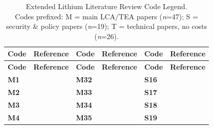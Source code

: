 \documentclass{article}
\renewcommand\_{\textunderscore\allowbreak}
\begin{document}
\clearpage

\captionsetup[longtable]{singlelinecheck=false}
{
\singlespacing
\setlength{\LTpre}{0pt}
\setlength{\LTpost}{4pt}

\small
\setlength{\tabcolsep}{4pt}
\begin{longtable}{p{0.9cm}>{\raggedright\arraybackslash}p{4cm}@{\hskip 0.5cm}p{0.9cm}>{\raggedright\arraybackslash}p{4cm}@{\hskip 0.5cm}p{0.9cm}>{\raggedright\arraybackslash}p{4cm}}
\caption[Extended Lithium Literature Review Code Legend.]{Extended Lithium Literature Review Code Legend. \\ Codes prefixed: \textsf{M} = main LCA/TEA papers (\emph{n}=47);
\textsf{S} = security \& policy papers (\emph{n}=19);
\textsf{T} = technical papers, no costs (\emph{n}=26).}
\label{tab:c2-litreview-legend}\\
\toprule
\textbf{Code} & \textbf{Reference} &
\textbf{Code} & \textbf{Reference} &
\textbf{Code} & \textbf{Reference} \\
\midrule
\endfirsthead
\toprule
\textbf{Code} & \textbf{Reference} &
\textbf{Code} & \textbf{Reference} &
\textbf{Code} & \textbf{Reference} \\
\midrule
\endhead
\bottomrule
\endfoot
\textcolor{codelabel}{\textsf{\textbf{M1}}} & \citet{agusdinataSocioenvironmentalImpactsLithium2018} & \textcolor{codelabel}{\textsf{\textbf{M32}}} & \citet{schenkerLithiumGeothermalBrines2024} & \textcolor{codelabel}{\textsf{\textbf{S16}}} & \citet{renMultiplexCharacteristicsVulnerability2024} \\
\textcolor{codelabel}{\textsf{\textbf{M2}}} & \citet{alessiaChallengesSustainableLithium2021} & \textcolor{codelabel}{\textsf{\textbf{M33}}} & \citet{schenkerCurrentFutureImpacts2025} & \textcolor{codelabel}{\textsf{\textbf{S17}}} & \citet{sunGlobalCompetitionLithiumIon2021} \\
\textcolor{codelabel}{\textsf{\textbf{M3}}} & \citet{ambroseUnderstandingFutureLithium2020a} & \textcolor{codelabel}{\textsf{\textbf{M34}}} & \citet{schombergExtendedLifeCycle2021} & \textcolor{codelabel}{\textsf{\textbf{S18}}} & \citet{tanMappingCobaltLithium2024} \\
\textcolor{codelabel}{\textsf{\textbf{M4}}} & \citet{buschEffectsDemandRecycling2025} & \textcolor{codelabel}{\textsf{\textbf{M35}}} & \citet{setuEnvironmentalImpactAssessment2026} & \textcolor{codelabel}{\textsf{\textbf{S19}}} & \citet{vivodaLithiumNexusEnergy2024} \\

\end{longtable}}
\end{document}
